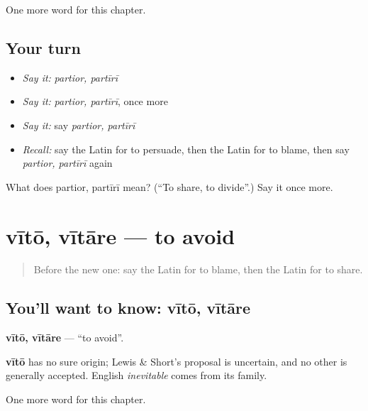 \begin{grammarlens}[title={What you've built}]
One more word for this chapter.
\end{grammarlens}

\subsection*{Your turn}
\begin{itemize}
\raggedright
  \item \emph{Say it:} \emph{partior, partīrī}
  \item \emph{Say it:} \emph{partior, partīrī}, once more
  \item \emph{Say it:} say \emph{partior, partīrī}
  \item \emph{Recall:} say the Latin for to persuade, then the Latin for to blame, then say \emph{partior, partīrī} again
\end{itemize}

\begin{tcolorbox}[breakable,colback=teal!4,colframe=teal!35!black,title={Before you move on}]
What does partior, partīrī mean? (\textquotedblleft{}To share, to divide\textquotedblright{}.) Say it once more.
\end{tcolorbox}
\section[vītō, vītāre]{vītō, vītāre — to avoid}

\label{lesson:LA-C199-vito}



\begin{quote}
Before the new one: say the Latin for to blame, then the Latin for to share.
\end{quote}

\subsection*{You'll want to know: vītō, vītāre}
\textbf{vītō, vītāre} — \textquotedblleft{}to avoid\textquotedblright{}.

\begin{cousinweb}
\textbf{vītō} has no sure origin; Lewis \& Short's proposal is uncertain, and no other is generally accepted. English \emph{inevitable} comes from its family.
\end{cousinweb}

\begin{grammarlens}[title={What you've built}]
One more word for this chapter.
\end{grammarlens}

